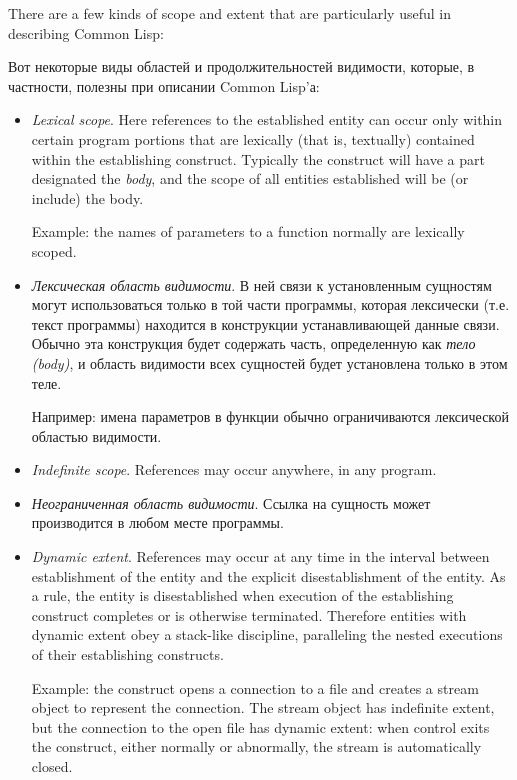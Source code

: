 There are a few kinds of scope and extent that are particularly useful
in describing Common Lisp:

Вот некоторые виды областей и продолжительностей видимости, которые, в частности,
полезны при описании Common Lisp'а:

\begin{itemize}
\item
{\it Lexical scope}.  Here references to the established
entity can occur only within certain program portions that are
lexically (that is, textually) contained within the establishing construct.
Typically the construct will have a part designated the {\it body},
and the scope of all entities established will be (or include) the body.

Example: the names of parameters to a function normally are lexically scoped.

\item 
{\it Лексическая область видимости}. В ней связи к установленным сущностям могут
использоваться только в той части программы, которая лексически (т.е. текст
программы) находится в конструкции устанавливающей данные связи. Обычно эта
конструкция будет содержать часть, определенную как {\it тело (body)}, и область
видимости всех сущностей будет установлена только в этом теле.

Например: имена параметров в функции обычно ограничиваются лексической областью
видимости.

\item
{\it Indefinite scope}.  References may occur anywhere, in any program.

\item
{\it Неограниченная область видимости}. Ссылка на сущность может производится в
любом месте программы.

\item
{\it Dynamic extent}.  References may occur at any time in the interval
between establishment of the entity and the explicit disestablishment
of the entity.  As a rule, the entity is disestablished when execution
of the establishing construct completes or is otherwise terminated.
Therefore entities with dynamic extent obey a stack-like discipline,
paralleling the nested executions of their establishing constructs.

Example: the  construct opens a connection to a file
and creates a stream object to represent the connection.  The stream object
has indefinite extent, but the connection to the open file has dynamic extent:
when control exits the  construct, either normally
or abnormally, the stream is automatically closed.


\end{itemize}
